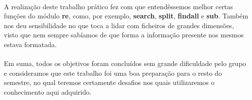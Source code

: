 \documentclass[11pt,a4paper]{report}
\begin{document}
\paragraph{}
A realização deste trabalho prático fez com que entendêssemos melhor certas funções do módulo \textbf{re}, como, por exemplo, \textbf{search}, \textbf{split}, \textbf{findall} e \textbf{sub}. Também nos deu sensibilidade no que toca a lidar com ficheiros de grandes dimensões, visto que nem sempre sabíamos de que forma a informação presente nos mesmos estava formatada. 
\paragraph{}
Em suma, todos os objetivos foram concluídos sem grande dificuldade pelo grupo e consideramos que este trabalho foi uma boa preparação para o resto do semestre, no qual teremos certamente desafios nos quais utilizaremos o conhecimento aqui adquirido. 
\end{document}
